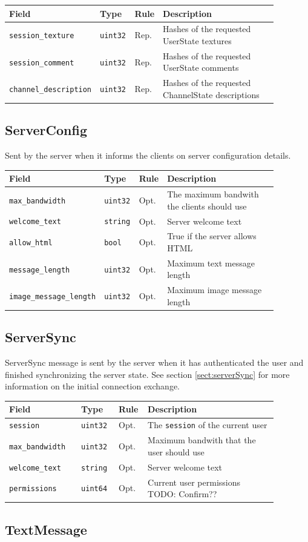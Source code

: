 \documentclass[11pt]{article} %
\newenvironment{mumbleMessageEx}
{%
	\small
	\renewcommand\arraystretch{1.5}
	\begin{tabular}{p{0.25\linewidth}p{0.13\linewidth}p{0.05\linewidth}p{0.45\linewidth}}
	Field & Type & Rule & Description \\
	\hline
}
{%
	\end{tabular}
	\renewcommand\arraystretch{1.0}
}
\newcommand{\mumbleMessageExItem}[4]{ \texttt{#1} & \texttt{#2} & #3 & #4 \\ }
\begin{document}
\begin{mumbleMessageEx}
\mumbleMessageExItem{session\_texture}{uint32}{Rep.}{Hashes of the requested UserState textures}
\mumbleMessageExItem{session\_comment}{uint32}{Rep.}{Hashes of the requested UserState comments}
\mumbleMessageExItem{channel\_description}{uint32}{Rep.}{Hashes of the requested ChannelState descriptions}
\end{mumbleMessageEx}

\subsection{ServerConfig}
\label{msg:serverConfig}

Sent by the server when it informs the clients on server configuration details.

\begin{mumbleMessageEx}
\mumbleMessageExItem{max\_bandwidth}{uint32}{Opt.}{The maximum bandwith the clients should use}
\mumbleMessageExItem{welcome\_text}{string}{Opt.}{Server welcome text}
\mumbleMessageExItem{allow\_html}{bool}{Opt.}{True if the server allows HTML}
\mumbleMessageExItem{message\_length}{uint32}{Opt.}{Maximum text message length}
\mumbleMessageExItem{image\_message\_length}{uint32}{Opt.}{Maximum image message length}
\end{mumbleMessageEx}

\subsection{ServerSync}
\label{msg:serverSync}

ServerSync message is sent by the server when it has authenticated the user and finished synchronizing the server state. See section \ref{sect:serverSync} for more information on the initial connection exchange.

\begin{mumbleMessageEx}
\mumbleMessageExItem{session}{uint32}{Opt.}{The \texttt{session} of the current user}
\mumbleMessageExItem{max\_bandwidth}{uint32}{Opt.}{Maximum bandwith that the user should use}
\mumbleMessageExItem{welcome\_text}{string}{Opt.}{Server welcome text}
\mumbleMessageExItem{permissions}{uint64}{Opt.}{Current user permissions TODO: Confirm??}
\end{mumbleMessageEx}

\subsection{TextMessage}
\label{msg:textMessage}
\end{document}
